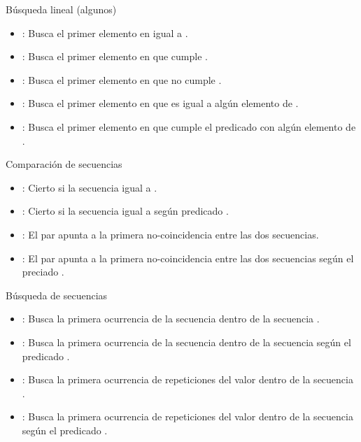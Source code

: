 \begin{frame}[t,fragile]{Búsqueda lineal (algunos)}
\begin{itemize}
  \item {}: Busca el primer elemento en \cppid{[i,f)} igual a .
  \item {}: Busca el primer elemento en \cppid{[i,f)} que cumple .
  \item {}: Busca el primer elemento en \cppid{[i,f)} que no cumple .
  \item {}: Busca el primer elemento en \cppid{[i,f)} que es igual a algún elemento
         de \cppid{[i2,f2)}.
  \item {}: Busca el primer elemento en \cppid{[i,f)} que 
        cumple el predicado  con algún elemento de \cppid{[i2,f2)}.
\end{itemize}
\end{frame}

\begin{frame}[t,fragile]{Comparación de secuencias}
\begin{itemize}
  \item {}: Cierto si la secuencia \cppid{[i,f)} igual a \cppid{[i2,i2+(f-i))}.
  \item {}: Cierto si la secuencia \cppid{[i,f)} igual a \cppid{[i2,i2+(f-i))} según predicado .
  \item {}: El par  apunta a la primera no-coincidencia entre las dos
        secuencias.
  \item {}: El par  apunta a la primera no-coincidencia entre las dos
        secuencias según el preciado .
\end{itemize}
\end{frame}

\begin{frame}[t,fragile]{Búsqueda de secuencias}
\begin{itemize}
  \item {}: Busca la primera ocurrencia de la secuencia \cppid{[i2,f2)} dentro
        de la secuencia \cppid{[i,f)}.
  \item {}: Busca la primera ocurrencia de la secuencia \cppid{[i2,f2)} dentro
        de la secuencia \cppid{[i,f)} según el predicado .
  \item {}: Busca la primera ocurrencia de  repeticiones del valor 
        dentro de la secuencia \cppid{[i,f)}.
  \item {}: Busca la primera ocurrencia de  repeticiones del valor 
        dentro de la secuencia \cppid{[i,f)} según el predicado .
\end{itemize}
\end{frame}

